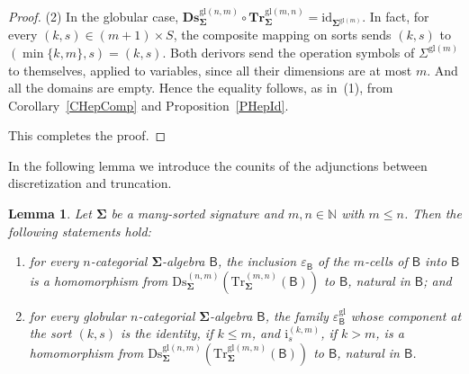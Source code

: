 \documentclass[a4paper, reqno
]{amsart}
\newcommand{\sig}[1]{\mathbf{#1}}             %
\newcommand{\calg}[1]{\boldsymbol{\mathsf{#1}}} %
\newcommand{\id}{\mathrm{id}}
\newcommand{\gl}{\mathrm{gl}}                %
\newcommand{\Ds}{\mathrm{Ds}}
\newcommand{\Tr}{\mathrm{Tr}}
\newcommand{\bDs}{\mathbf{Ds}}
\newcommand{\bTr}{\mathbf{Tr}}
\theoremstyle{plain}
\newtheorem{lemma}[theorem]{Lemma}
\theoremstyle{definition}
\begin{document}
\begin{proof}
(2) In the globular case, $\bDs^{\gl(n,m)}_{\sig{\Sigma}}\circ\bTr^{\gl(m,n)}_{\sig{\Sigma}}=\id_{\sig{\Sigma}^{\gl(m)}}$.
In fact, for every $(k,s)\in(m+1)\times S$, the composite mapping on sorts sends $(k,s)$ to $(\min\{k,m\},s)=(k,s)$.
Both derivors send the operation symbols of $\Sigma^{\gl(m)}$ to themselves, applied to variables, since all their dimensions are at most $m$.
And all the domains are empty.
Hence the equality follows, as in~(1), from Corollary~\ref{CHepComp} and Proposition~\ref{PHepId}.

This completes the proof.
\end{proof}

In the following lemma we introduce the counits of the adjunctions between discretization and truncation.

\begin{lemma}\label{LDiscTruncCounit}
Let $\sig{\Sigma}$ be a many-sorted signature and $m,n\in\mathbb{N}$ with $m\leq n$.
Then the following statements hold:
\begin{enumerate}
\item for every $n$-categorial $\sig{\Sigma}$-algebra $\calg{B}$, the inclusion $\varepsilon_{\calg{B}}$ of the $m$-cells of $\calg{B}$ into $\calg{B}$ is a homomorphism from $\Ds^{(n,m)}_{\sig{\Sigma}}(\Tr^{(m,n)}_{\sig{\Sigma}}(\calg{B}))$ to $\calg{B}$, natural in $\calg{B}$; and
\item for every globular $n$-categorial $\sig{\Sigma}$-algebra $\calg{B}$, the family $\varepsilon^{\gl}_{\calg{B}}$ whose component at the sort $(k,s)$ is the identity, if $k\leq m$, and $\mathrm{i}^{(k,m)}_{s}$, if $k>m$, is a homomorphism from $\Ds^{\gl(n,m)}_{\sig{\Sigma}}(\Tr^{\gl(m,n)}_{\sig{\Sigma}}(\calg{B}))$ to $\calg{B}$, natural in $\calg{B}$.
\end{enumerate}
\end{lemma}
\end{document}

